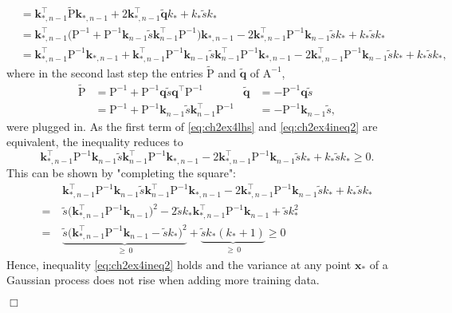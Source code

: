 \documentclass[11pt, a4paper]{scrartcl}
\newcommand{\transposed}{{\!\top\!}}
\renewcommand{\vec}[1]{\bm{#1}}
\newcommand{\mat}[1]{\bm{\mathrm{#1}}}
\newcommand{\qed}{\hfill\(\Box\)}
\begin{document}
\begin{align}
					&= \vec{k}_{\ast, n - 1}^\transposed \tilde{\mat{P}} \vec{k}_{\ast, n - 1} + 2 \vec{k}_{\ast, n - 1}^\transposed \tilde{\vec{q}} k_\ast + k_\ast \tilde{s} k_\ast \\
					&= \vec{k}_{\ast, n - 1}^\transposed \big( \mat{P}^{-1} + \mat{P}^{-1} \vec{k}_{n - 1} \tilde{s} \vec{k}_{n - 1}^\transposed \mat{P}^{-1} \big) \vec{k}_{\ast, n - 1} - 2 \vec{k}_{\ast, n - 1}^\transposed \mat{P}^{-1} \vec{k}_{n - 1} \tilde{s} k_\ast + k_\ast \tilde{s} k_\ast \\
					&= \vec{k}_{\ast, n - 1}^\transposed \mat{P}^{-1} \vec{k}_{\ast, n - 1} + \vec{k}_{\ast, n - 1}^\transposed \mat{P}^{-1} \vec{k}_{n - 1} \tilde{s} \vec{k}_{n - 1}^\transposed \mat{P}^{-1} \vec{k}_{\ast, n - 1} - 2 \vec{k}_{\ast, n - 1}^\transposed \mat{P}^{-1} \vec{k}_{n - 1} \tilde{s} k_\ast + k_\ast \tilde{s} k_\ast,  \label{eq:ch2ex4lhs}
			\end{align}
			where in the second last step the entries \( \tilde{\mat{P}} \) and \( \tilde{\vec{q}} \) of \( \mat{A}^{-1} \),
			\begin{align}
				\tilde{\mat{P}} &= \mat{P}^{-1} + \mat{P}^{-1} \vec{q} \tilde{s} \vec{q}^\transposed \mat{P}^{-1}
				&
				\tilde{\vec{q}} &= -\mat{P}^{-1} \vec{q} \tilde{s} \\
				                &= \mat{P}^{-1} + \mat{P}^{-1} \vec{k}_{n - 1} \tilde{s} \vec{k}_{n - 1}^\transposed \mat{P}^{-1}
				&
				                &= -\mat{P}^{-1} \vec{k}_{n - 1} \tilde{s},
			\end{align}
			were plugged in. As the first term of \eqref{eq:ch2ex4lhs} and \eqref{eq:ch2ex4ineq2} are equivalent, the inequality reduces to
			\begin{equation}
				\vec{k}_{\ast, n - 1}^\transposed \mat{P}^{-1} \vec{k}_{n - 1} \tilde{s} \vec{k}_{n - 1}^\transposed \mat{P}^{-1} \vec{k}_{\ast, n - 1} - 2 \vec{k}_{\ast, n - 1}^\transposed \mat{P}^{-1} \vec{k}_{n - 1} \tilde{s} k_\ast + k_\ast \tilde{s} k_\ast \geq 0.
			\end{equation}
			This can be shown by "completing the square":
			\begin{align}
				 &\; \vec{k}_{\ast, n - 1}^\transposed \mat{P}^{-1} \vec{k}_{n - 1} \tilde{s} \vec{k}_{n - 1}^\transposed \mat{P}^{-1} \vec{k}_{\ast, n - 1} - 2 \vec{k}_{\ast, n - 1}^\transposed \mat{P}^{-1} \vec{k}_{n - 1} \tilde{s} k_\ast + k_\ast \tilde{s} k_\ast \\
				=&\; \tilde{s} \big( \vec{k}_{\ast, n - 1}^\transposed \mat{P}^{-1} \vec{k}_{n - 1} \big)^2 - 2 \tilde{s} k_\ast \vec{k}_{\ast, n - 1}^\transposed \mat{P}^{-1} \vec{k}_{n - 1} + \tilde{s} k_\ast^2 \\
				=&\; \underbrace{\tilde{s} \big( \vec{k}_{\ast, n - 1}^\transposed \mat{P}^{-1} \vec{k}_{n - 1} - \tilde{s} k_\ast \big)^2}_{\geq\, 0} + \underbrace{\tilde{s} k_\ast (k_\ast + 1)}_{\geq\, 0} \geq 0
			\end{align}
			Hence, inequality \autoref{eq:ch2ex4ineq2} holds and the variance at any point \( \vec{x}_\ast \) of a Gaussian process does not rise when adding more training data.

			\qed
\end{document}
